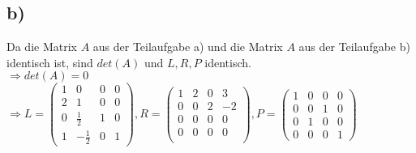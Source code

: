     \subsection{b)}
        Da die Matrix $A$ aus der Teilaufgabe a) und die Matrix $A$ aus der Teilaufgabe b) identisch ist, sind $det(A)$ und $L,R,P$ identisch. \\
        $\Rightarrow det(A)=0 $  \\
        $\Rightarrow L = \begin{pmatrix}
            1 & 0 & 0 & 0 \\
            2 & 1 & 0 & 0 \\
            0 & \frac{1}{2} & 1 & 0 \\
            1 & -\frac{1}{2} & 0 & 1
        \end{pmatrix}, R=
        \begin{pmatrix}
            1 & 2 & 0 & 3 \\
            0 & 0 & 2 & -2 \\
            0 & 0 & 0 & 0 \\
            0 & 0 & 0 & 0 \\
        \end{pmatrix}, P = 
        \begin{pmatrix}
            1 & 0 & 0 & 0 \\
            0 & 0 & 1 & 0 \\
            0 & 1 & 0 & 0 \\
            0 & 0 & 0 & 1 
        \end{pmatrix}$
        
